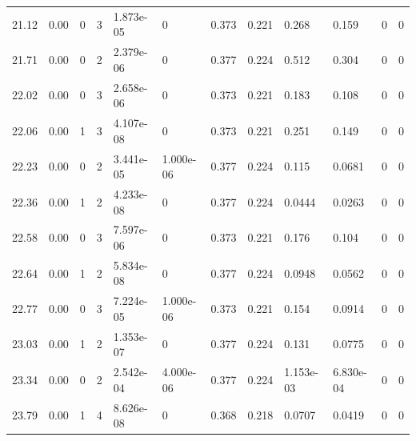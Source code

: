 \documentclass[preview]{standalone}
\begin{document}
{{{\begin{tabular}{L{1.2cm}C{1.2cm} C{0.3cm}C{0.5cm} C{1.4cm}C{1.4cm} C{1.4cm}C{1.4cm} C{1.6cm}C{1.6cm} C{1.6cm}C{1.6cm}}
  21.12  &  0.00  & 0     &  3 &  1.873e-05  & 0  &  0.373&   0.221& 0.268 & 0.159   &  0 & 0  \\ 
  21.71  &  0.00  & 0     &  2 &  2.379e-06  & 0  &  0.377&   0.224& 0.512 & 0.304   &  0 & 0  \\ 
  22.02  &  0.00  & 0     &  3 &  2.658e-06  & 0  &  0.373&   0.221& 0.183 & 0.108   &  0 & 0  \\ 
  22.06  &  0.00  & 1     &  3 &  4.107e-08  & 0  &  0.373&   0.221& 0.251 & 0.149   &  0 & 0  \\ 
  22.23  &  0.00  & 0     &  2 &  3.441e-05  & 1.000e-06  &  0.377&   0.224& 0.115 & 0.0681   &  0 & 0  \\ 
  22.36  &  0.00  & 1     &  2 &  4.233e-08  & 0  &  0.377&   0.224& 0.0444 & 0.0263   &  0 & 0  \\ 
  22.58  &  0.00  & 0     &  3 &  7.597e-06  & 0  &  0.373&   0.221& 0.176 & 0.104   &  0 & 0  \\ 
  22.64  &  0.00  & 1     &  2 &  5.834e-08  & 0  &  0.377&   0.224& 0.0948 & 0.0562   &  0 & 0  \\ 
  22.77  &  0.00  & 0     &  3 &  7.224e-05  & 1.000e-06  &  0.373&   0.221& 0.154 & 0.0914   &  0 & 0  \\ 
  23.03  &  0.00  & 1     &  2 &  1.353e-07  & 0  &  0.377&   0.224& 0.131 & 0.0775   &  0 & 0  \\ 
  23.34  &  0.00  & 0     &  2 &  2.542e-04  & 4.000e-06  &  0.377&   0.224& 1.153e-03 & 6.830e-04   &  0 & 0  \\ 
  23.79  &  0.00  & 1     &  4 &  8.626e-08  & 0  &  0.368&   0.218& 0.0707 & 0.0419   &  0 & 0  \\ 
\hline 
\end{tabular} 

}}}
\end{document}
